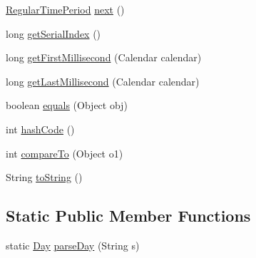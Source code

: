\begin{DoxyCompactItemize}
\item 
\mbox{\hyperlink{classorg_1_1jfree_1_1data_1_1time_1_1_regular_time_period}{Regular\+Time\+Period}} \mbox{\hyperlink{classorg_1_1jfree_1_1data_1_1time_1_1_day_aad0dd966ec94fe5fdc994fbfb6bcea8e}{next}} ()
\item 
long \mbox{\hyperlink{classorg_1_1jfree_1_1data_1_1time_1_1_day_ad4ca0021935416cd8b1d2b9d92f1f626}{get\+Serial\+Index}} ()
\item 
long \mbox{\hyperlink{classorg_1_1jfree_1_1data_1_1time_1_1_day_a78659c479b54234383d2aca252f5256b}{get\+First\+Millisecond}} (Calendar calendar)
\item 
long \mbox{\hyperlink{classorg_1_1jfree_1_1data_1_1time_1_1_day_a3949f4dc9d25051075139dd021a530ec}{get\+Last\+Millisecond}} (Calendar calendar)
\item 
boolean \mbox{\hyperlink{classorg_1_1jfree_1_1data_1_1time_1_1_day_a444b56d6367d190fdafd0c04340c80b8}{equals}} (Object obj)
\item 
int \mbox{\hyperlink{classorg_1_1jfree_1_1data_1_1time_1_1_day_ae130884de4d0caea794ea51de6a3acbb}{hash\+Code}} ()
\item 
int \mbox{\hyperlink{classorg_1_1jfree_1_1data_1_1time_1_1_day_af4bb592b342a442768f910d32407cb7d}{compare\+To}} (Object o1)
\item 
String \mbox{\hyperlink{classorg_1_1jfree_1_1data_1_1time_1_1_day_af4317639b59d575a4f86c4effac08e55}{to\+String}} ()
\end{DoxyCompactItemize}
\subsection*{Static Public Member Functions}
\begin{DoxyCompactItemize}
\item 
static \mbox{\hyperlink{classorg_1_1jfree_1_1data_1_1time_1_1_day}{Day}} \mbox{\hyperlink{classorg_1_1jfree_1_1data_1_1time_1_1_day_a2a6cfeb8ba36658ba709fbb2e5548ad9}{parse\+Day}} (String s)
\end{DoxyCompactItemize}
